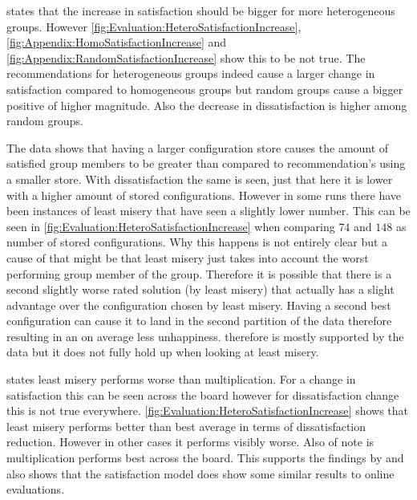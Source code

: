  states that the increase in satisfaction should be bigger for more heterogeneous groups. However \autoref{fig:Evaluation:HeteroSatisfactionIncrease}, \autoref{fig:Appendix:HomoSatisfactionIncrease} and \autoref{fig:Appendix:RandomSatisfactionIncrease} show this to be not true. The recommendations for heterogeneous groups indeed cause a larger change in satisfaction compared to homogeneous groups but random groups cause a bigger positive of higher magnitude. Also the decrease in dissatisfaction is higher among random groups.

The data shows that having a larger configuration store causes the amount of satisfied group members to be greater than compared to recommendation's using a smaller store. With dissatisfaction the same is seen, just that here it is lower with a higher amount of stored configurations. However in some runs there have been instances of least misery that have seen a slightly lower number. This can be seen in \autoref{fig:Evaluation:HeteroSatisfactionIncrease} when comparing $74$ and $148$ as number of stored configurations. Why this happens is not entirely clear but a cause of that might be that least misery just takes into account the worst performing group member of the group. Therefore it is possible that there is a second slightly worse rated solution (by least misery) that actually has a slight advantage over the configuration chosen by least misery. Having a second best configuration can cause it to land in the second partition of the data therefore resulting in an on average less unhappiness.  therefore is mostly supported by the data but it does not fully hold up when looking at least misery.

 states least misery performs worse than multiplication. For a change in satisfaction this can be seen across the board however for dissatisfaction change this is not true everywhere. \autoref{fig:Evaluation:HeteroSatisfactionIncrease} shows that least misery performs better than best average in terms of dissatisfaction reduction. However in other cases it performs visibly worse. Also of note is multiplication performs best across the board. This supports the findings by \citeauthor{Masthoff2015} \cite[p. 755f]{Masthoff2015} and also shows that the satisfaction model does show some similar results to online evaluations.  

